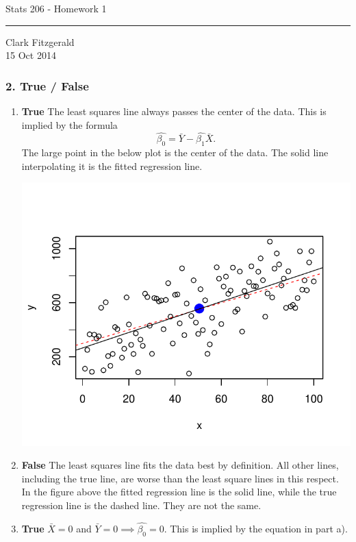 \documentclass[12pt]{article}
\begin{document}
\begin{center}
    {\Large Stats 206 - Homework 1}\\
    \bigskip
    \bigskip
    \hrule
    \medskip
    Clark Fitzgerald\\
    15 Oct 2014
\end{center}

\subsubsection*{2. True / False}
\begin{enumerate}[label=\alph*]
\item  \textbf{True} The least squares line always passes the center of the data.
This is implied by the formula
\[
    \hat{\beta_0} = \bar{Y} - \hat{\beta_1} \bar{X}.
\]
The large point in the below plot is the center of the data. The solid line
interpolating it is the fitted regression line.

\centerline{\includegraphics{regress.pdf}}

\item \textbf{False} The least squares line fits the data
best by definition. All other lines, including the true line, are worse
than the least square lines in this respect. 
In the figure above the fitted regression line is the solid line,
while the true regression line is the dashed line. They are not the same.

\item \textbf{True} $\bar{X} = 0$ and $\bar{Y} = 0 \implies \hat{\beta_0} =
0$. This is implied by the equation in part a).


\end{enumerate}
\end{document}
